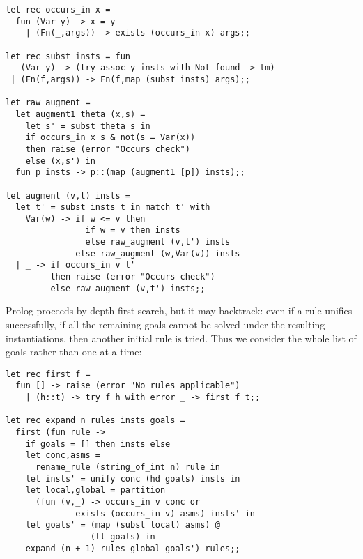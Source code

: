 \begin{slide*}


\begin{black}\begin{footnotesize}\begin{verbatim}
let rec occurs_in x =
  fun (Var y) -> x = y
    | (Fn(_,args)) -> exists (occurs_in x) args;;

let rec subst insts = fun
   (Var y) -> (try assoc y insts with Not_found -> tm)
 | (Fn(f,args)) -> Fn(f,map (subst insts) args);;

let raw_augment =
  let augment1 theta (x,s) =
    let s' = subst theta s in
    if occurs_in x s & not(s = Var(x))
    then raise (error "Occurs check")
    else (x,s') in
  fun p insts -> p::(map (augment1 [p]) insts);;

let augment (v,t) insts =
  let t' = subst insts t in match t' with
    Var(w) -> if w <= v then
                if w = v then insts
                else raw_augment (v,t') insts
              else raw_augment (w,Var(v)) insts
  | _ -> if occurs_in v t'
         then raise (error "Occurs check")
         else raw_augment (v,t') insts;;
\end{verbatim}\end{footnotesize}\end{black}

\end{slide*}



\begin{slide*}


Prolog proceeds by depth-first search, but it may backtrack: even if a rule
unifies successfully, if all the remaining goals cannot be solved under the
resulting instantiations, then another initial rule is tried. Thus we consider
the whole list of goals rather than one at a time:

\begin{black}\begin{footnotesize}\begin{verbatim}
let rec first f =
  fun [] -> raise (error "No rules applicable")
    | (h::t) -> try f h with error _ -> first f t;;

let rec expand n rules insts goals =
  first (fun rule ->
    if goals = [] then insts else
    let conc,asms =
      rename_rule (string_of_int n) rule in
    let insts' = unify conc (hd goals) insts in
    let local,global = partition
      (fun (v,_) -> occurs_in v conc or
              exists (occurs_in v) asms) insts' in
    let goals' = (map (subst local) asms) @
                 (tl goals) in
    expand (n + 1) rules global goals') rules;;
\end{verbatim}\end{footnotesize}\end{black}

\end{slide*}



